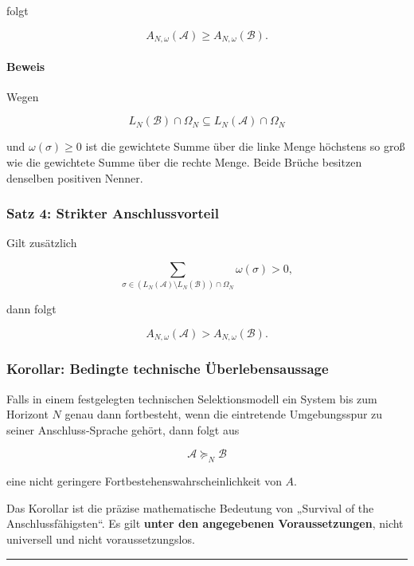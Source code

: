 \documentclass[
  10pt,
  a4paper,
]{article}
\begin{document}
folgt

\[
A_{N,\omega}(\mathcal A)
\ge
A_{N,\omega}(\mathcal B).
\]

\hypertarget{beweis-1}{%
\paragraph{Beweis}\label{beweis-1}}

Wegen

\[
L_N(\mathcal B)\cap\Omega_N
\subseteq
L_N(\mathcal A)\cap\Omega_N
\]

und \(\omega(\sigma)\ge0\) ist die gewichtete Summe über die linke Menge
höchstens so groß wie die gewichtete Summe über die rechte Menge. Beide
Brüche besitzen denselben positiven Nenner.

\hypertarget{satz-4-strikter-anschlussvorteil}{%
\subsubsection{Satz 4: Strikter
Anschlussvorteil}\label{satz-4-strikter-anschlussvorteil}}

Gilt zusätzlich

\[
\sum_{\sigma\in
(L_N(\mathcal A)\setminus L_N(\mathcal B))
\cap\Omega_N}
\omega(\sigma)>0,
\]

dann folgt

\[
A_{N,\omega}(\mathcal A)
>
A_{N,\omega}(\mathcal B).
\]

\hypertarget{korollar-bedingte-technische-uxfcberlebensaussage}{%
\subsubsection{Korollar: Bedingte technische
Überlebensaussage}\label{korollar-bedingte-technische-uxfcberlebensaussage}}

Falls in einem festgelegten technischen Selektionsmodell ein System bis
zum Horizont \(N\) genau dann fortbesteht, wenn die eintretende
Umgebungsspur zu seiner Anschluss-Sprache gehört, dann folgt aus

\[
\mathcal A\succeq_N\mathcal B
\]

eine nicht geringere Fortbestehenswahrscheinlichkeit von \(A\).

Das Korollar ist die präzise mathematische Bedeutung von „Survival of
the Anschlussfähigsten``. Es gilt \textbf{unter den angegebenen
Voraussetzungen}, nicht universell und nicht voraussetzungslos.

\begin{center}\rule{0.5\linewidth}{0.5pt}\end{center}
\end{document}
